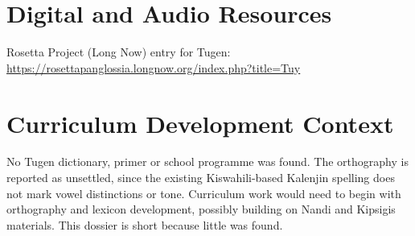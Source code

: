 \documentclass[12pt]{article}
\begin{document}
\section{Digital and Audio Resources}
Rosetta Project (Long Now) entry for Tugen: \url{https://rosettapanglossia.longnow.org/index.php?title=Tuy}

\section{Curriculum Development Context}
No Tugen dictionary, primer or school programme was found. The orthography is reported as unsettled, since the existing Kiswahili-based Kalenjin spelling does not mark vowel distinctions or tone. Curriculum work would need to begin with orthography and lexicon development, possibly building on Nandi and Kipsigis materials. This dossier is short because little was found.
\end{document}
